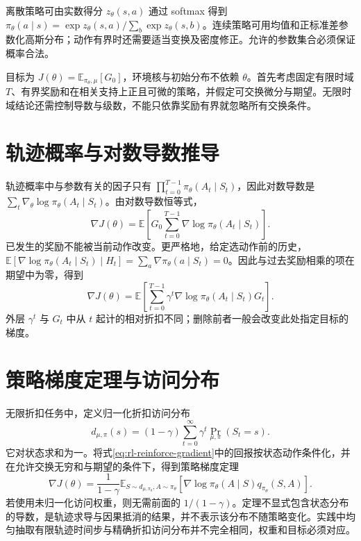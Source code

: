 \documentclass[UTF8,12pt,a4paper,fontset=fandol]{ctexbook}
\begin{document}
离散策略可由实数得分 $z_\theta(s,a)$ 通过 softmax 得到 $\pi_\theta(a\mid s)=\exp z_\theta(s,a)/\sum_b\exp z_\theta(s,b)$。连续策略可用均值和正标准差参数化高斯分布；动作有界时还需要适当变换及密度修正。允许的参数集合必须保证概率合法。

目标为 $J(\theta)=\mathbb E_{\pi_\theta,\mu}[G_0]$，环境核与初始分布不依赖 $\theta$。首先考虑固定有限时域 $T$、有界奖励和在相关支持上正且可微的策略，并假定可交换微分与期望。无限时域结论还需控制导数与级数，不能只依靠奖励有界就忽略所有交换条件。

\section{轨迹概率与对数导数推导}

轨迹概率中与参数有关的因子只有 $\prod_{t=0}^{T-1}\pi_\theta(A_t\mid S_t)$，因此对数导数是 $\sum_t\nabla_\theta\log\pi_\theta(A_t\mid S_t)$。由对数导数恒等式，
\[
\nabla J(\theta)=\mathbb E\!\left[G_0\sum_{t=0}^{T-1}\nabla\log\pi_\theta(A_t\mid S_t)\right].
\]
已发生的奖励不能被当前动作改变。更严格地，给定选动作前的历史，$\mathbb E[\nabla\log\pi_\theta(A_t\mid S_t)\mid H_t]=\sum_a\nabla\pi_\theta(a\mid S_t)=0$。因此与过去奖励相乘的项在期望中为零，得到
\begin{equation}
\nabla J(\theta)=\mathbb E\!\left[\sum_{t=0}^{T-1}\gamma^t\nabla\log\pi_\theta(A_t\mid S_t)G_t\right].
\label{eq:rl-reinforce-gradient}
\end{equation}
外层 $\gamma^t$ 与 $G_t$ 中从 $t$ 起计的相对折扣不同；删除前者一般会改变此处指定目标的梯度。

\section{策略梯度定理与访问分布}

无限折扣任务中，定义归一化折扣访问分布
\[
d_{\mu,\pi}(s)=(1-\gamma)\sum_{t=0}^\infty\gamma^t\Pr_{\mu,\pi}(S_t=s).
\]
它对状态求和为一。将式\eqref{eq:rl-reinforce-gradient}中的回报按状态动作条件化，并在允许交换无穷和与期望的条件下，得到策略梯度定理
\begin{equation}
\nabla J(\theta)=\frac1{1-\gamma}\mathbb E_{S\sim d_{\mu,\pi_\theta},A\sim\pi_\theta}
\left[\nabla\log\pi_\theta(A\mid S)q_{\pi_\theta}(S,A)\right].
\label{eq:rl-policy-gradient}
\end{equation}
若使用未归一化访问权重，则无需前面的 $1/(1-\gamma)$。定理不显式包含状态分布的导数，是轨迹求导与因果抵消的结果，并不表示该分布不随策略变化。实践中均匀抽取有限轨迹时间步与精确折扣访问分布并不完全相同，权重和目标必须对应。
\end{document}
